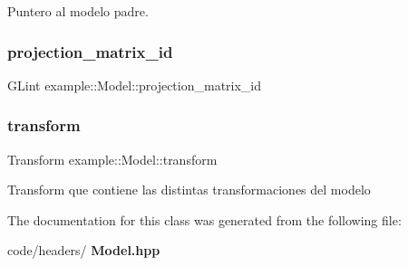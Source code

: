 Puntero al modelo padre. \mbox{\label{classexample_1_1_model_a27350f6bf650caf77e0f3cb028febab6}} 
\subsubsection{projection\_matrix\_id}
{\footnotesize\ttfamily G\+Lint example\+::\+Model\+::projection\+\_\+matrix\+\_\+id}

\mbox{\label{classexample_1_1_model_ac212587da9b10b3cd5222dd3136c071c}} 
\subsubsection{transform}
{\footnotesize\ttfamily Transform example\+::\+Model\+::transform}

Transform que contiene las distintas transformaciones del modelo 

The documentation for this class was generated from the following file\+:\begin{DoxyCompactItemize}
\item 
code/headers/\textbf{ Model.\+hpp}\end{DoxyCompactItemize}
